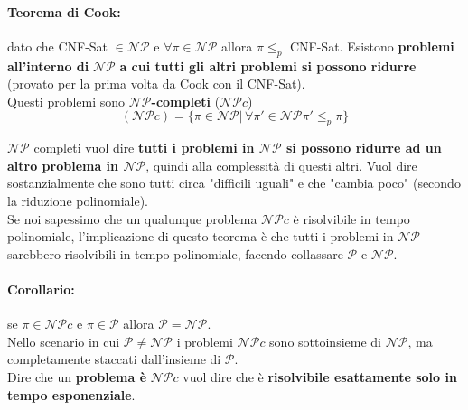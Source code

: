 \newpage

\paragraph{Teorema di Cook:} dato che CNF-Sat $\in \mathcal{NP}$ e $\forall \pi \in \mathcal{NP}$ allora $\pi \leq_p$ CNF-Sat. Esistono \textbf{problemi all'interno di }$\mathcal{NP}$ \textbf{a cui tutti gli altri problemi si possono ridurre} (provato per la prima volta da Cook con il CNF-Sat).\\

Questi problemi sono \textbf{$\mathcal{NP}$-completi} ($\mathcal{NP}c$)
$$(\mathcal{NP}c) = \{\pi \in \mathcal{NP} | \, \forall \pi' \in \mathcal{NP} \pi' \leq_p \pi\} $$

$\mathcal{NP}$ completi vuol dire \textbf{tutti i problemi in $\mathcal{NP}$ si possono ridurre ad un altro problema in $\mathcal{NP}$}, quindi alla complessità di questi altri. Vuol dire sostanzialmente che sono tutti circa "difficili uguali" e che "cambia poco" (secondo la riduzione polinomiale).\\

Se noi sapessimo che un qualunque problema $\mathcal{NP}c$ è risolvibile in tempo polinomiale, l'implicazione di questo teorema è che tutti i problemi in $\mathcal{NP}$ sarebbero risolvibili in tempo polinomiale, facendo collassare $\mathcal{P}$ e $\mathcal{NP}$.\\

\paragraph{Corollario:} se $\pi \in \mathcal{NP}c$ e $\pi \in \mathcal{P}$ allora $\mathcal{P} = \mathcal{NP}$.\\

Nello scenario in cui $\mathcal{P} \neq \mathcal{NP}$ i problemi $\mathcal{NP}c$ sono sottoinsieme di $\mathcal{NP}$, ma completamente staccati dall'insieme di $\mathcal{P}$.\\

Dire che un \textbf{problema è} $\mathcal{NP}c$ vuol dire che è \textbf{risolvibile esattamente solo in tempo esponenziale}.\\

\newpage